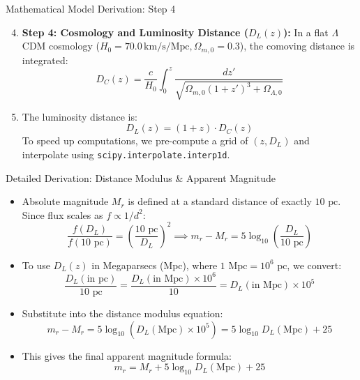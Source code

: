 \documentclass[9pt]{beamer}
\begin{document}
\begin{frame}{Mathematical Model Derivation: Step 4}
  \begin{enumerate}
    \setcounter{enumi}{3}
    \item \textbf{Step 4: Cosmology and Luminosity Distance ($D_L(z)$):}
      In a flat $\Lambda$CDM cosmology ($H_0 = 70.0 \, \text{km/s/Mpc}, \Omega_{m,0} = 0.3$), the comoving distance is integrated:
      $$D_C(z) = \frac{c}{H_0} \int_0^z \frac{dz'}{\sqrt{\Omega_{m,0}(1+z')^3 + \Omega_{\Lambda,0}}}$$
    \item The luminosity distance is:
      $$D_L(z) = (1+z) \cdot D_C(z)$$
      To speed up computations, we pre-compute a grid of $(z, D_L)$ and interpolate using \texttt{scipy.interpolate.interp1d}.
  \end{enumerate}
\end{frame}

\begin{frame}{Detailed Derivation: Distance Modulus \& Apparent Magnitude}
  \begin{itemize}
    \item Absolute magnitude $M_r$ is defined at a standard distance of exactly $10\text{ pc}$. Since flux scales as $f \propto 1/d^2$:
      $$\frac{f(D_L)}{f(10\text{ pc})} = \left( \frac{10\text{ pc}}{D_L} \right)^2 \implies m_r - M_r = 5 \log_{10} \left( \frac{D_L}{10\text{ pc}} \right)$$
    \item To use $D_L(z)$ in Megaparsecs ($\text{Mpc}$), where $1\text{ Mpc} = 10^6\text{ pc}$, we convert:
      $$\frac{D_L(\text{in pc})}{10\text{ pc}} = \frac{D_L(\text{in Mpc}) \times 10^6}{10} = D_L(\text{in Mpc}) \times 10^5$$
    \item Substitute into the distance modulus equation:
      $$m_r - M_r = 5 \log_{10} \left( D_L(\text{Mpc}) \times 10^5 \right) = 5 \log_{10} D_L(\text{Mpc}) + 25$$
    \item This gives the final apparent magnitude formula:
      $$m_r = M_r + 5 \log_{10} D_L(\text{Mpc}) + 25$$
  \end{itemize}
\end{frame}
\end{document}
